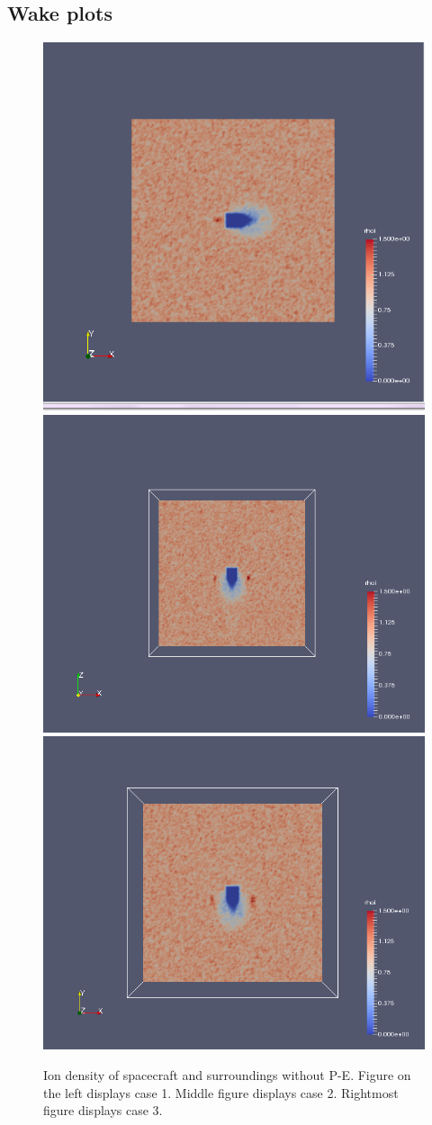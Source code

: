 \subsection{Wake plots}

    \begin{figure}
        \includegraphics[width = 0.3 \textwidth]{images/ion density case1}
        \includegraphics[width = 0.3 \textwidth]{images/ion density x-z case2}
	 \includegraphics[width = 0.3 \textwidth]{images/ion density x-y case3}
        \caption{Ion density of spacecraft and surroundings without P-E. Figure on the left displays case 1. Middle figure displays case 2. Rightmost figure displays case 3.}
    \end{figure}
